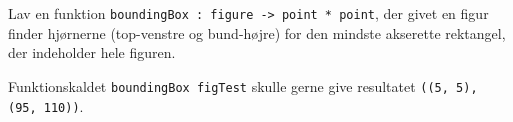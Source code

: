 Lav en funktion \texttt{boundingBox : figure -> point * point}, der
givet en figur finder hjørnerne (top-venstre og bund-højre) for den
mindste akserette rektangel, der indeholder hele figuren.

Funktionskaldet \texttt{boundingBox figTest} skulle gerne give
resultatet \texttt{((5, 5), (95, 110))}.
